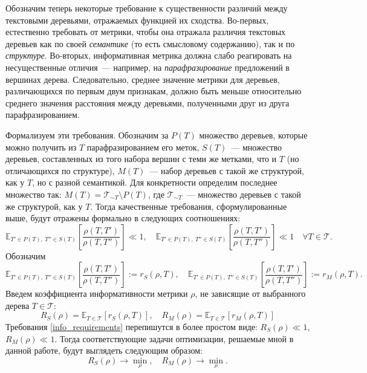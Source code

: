 \documentclass[12pt]{article}
\newcommand{\E}{\mathbb{E}}
\begin{document}
Обозначим теперь некоторые требование к существенности различий между текстовыми деревьями, отражаемых функцией их сходства. Во-первых, естественно требовать от метрики, чтобы она отражала различия текстовых деревьев как по своей \textit{семантике} (то есть смысловому содержанию), так и по \textit{структуре}. Во-вторых, информативная метрика должна слабо реагировать на несущественные отличия~--- например, на \textit{парафразирование} предложений в вершинах дерева. Следовательно, среднее значение метрики для деревьев, различающихся по первым двум признакам, должно быть меньше относительно среднего значения расстояния между деревьями, полученными друг из друга парафразированием. 

Формализуем эти требования. Обозначим за $P(T)$ множество деревьев, которые можно получить из $T$ парафразированием его меток, $S(T)$~--- множество деревьев, составленных из того набора вершин с теми же метками, что и $T$ (но отличающихся по структуре), $M(T)$~--- набор деревьев с такой же структурой, как у $T$, но с разной семантикой. Для конкретности определим последнее множество так: $M(T) = \mathcal{T}_{\sim T} \setminus P(T)$, где $\mathcal{T}_{\sim T}$~--- множество деревьев с такой же структурой, как у $T$. Тогда качественные требования, сформулированные выше, будут отражены формально в следующих соотношениях:
\begin{equation} \label{info_requirements}
    \E_{T'\in P(T), \ T''\in S(T)} \left[\frac{\rho(T, T')}{\rho(T, T'')}\right] \ll 1, \quad \E_{T'\in P(T), \ T''\in S(T)} \left[\frac{\rho(T, T')}{\rho(T, T'')}\right] \ll 1 \quad \forall T\in\mathcal{T}.
\end{equation}
Обозначим
\begin{equation} \label{r_coeffs}
    \E_{T'\in P(T), \ T''\in S(T)} \left[\frac{\rho(T, T')}{\rho(T, T'')}\right] := r_S(\rho, T), \quad \E_{T'\in P(T), \ T''\in S(T)} \left[\frac{\rho(T, T')}{\rho(T, T'')}\right] := r_M(\rho, T).    
\end{equation}
Введем коэффициента информативности метрики $\rho$, не зависящие от выбранного дерева $T\in\mathcal{T}$:
\begin{equation} \label{R_coeffs}
    R_S(\rho) = \E_{T\in \mathcal{T}}[r_S(\rho, T)], \quad R_M(\rho) = \E_{T\in \mathcal{T}}[r_M(\rho, T)] 
\end{equation}
Требования \eqref{info_requirements} перепишутся в более простом виде: $R_S(\rho) \ll 1$, $R_M(\rho) \ll 1$. Тогда соответствующие задачи оптимизации, решаемые мной в данной работе, будут выглядеть следующим образом:
\begin{equation} \label{optimization_problem}
     R_S(\rho) \longrightarrow \min_\rho, \quad  R_M(\rho) \longrightarrow \min_\rho.
\end{equation}
\end{document}
